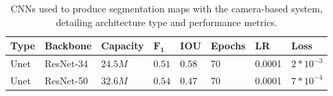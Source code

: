 \begin{table}[htbp]
\caption{CNNs used to produce segmentation maps with the camera-based system, detailing architecture type and performance metrics.}\label{tab:cog-model}
\centering
    \begin{tabular}{llllllll}
    \toprule
    \textbf{Type}         & \textbf{Backbone}  & \textbf{Capacity} & \textbf{$\mathbf{F_{1}}$} & \textbf{IOU}  & \textbf{Epochs} &  \textbf{LR} & \textbf{Loss} \\
    \midrule
    Unet                  & ResNet-34          & $24.5M$           & $0.51$                & $0.58$    & 70              & \num{0.0001} & $2*10^{-3}$   \\
    Unet                  & ResNet-50          & $32.6M$           & $0.54$                & $0.47$    & 70              & \num{0.0001} & $7*10^{-4}$   \\
    \bottomrule
    \end{tabular}
\end{table}